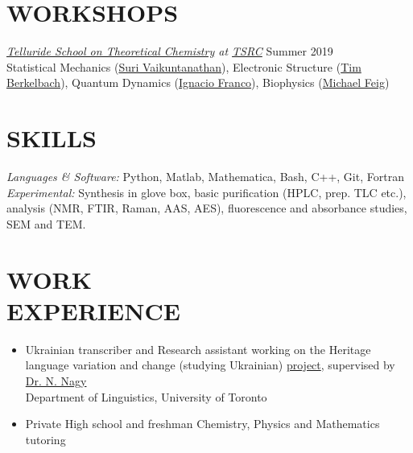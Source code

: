 \documentclass[9pt, margin]{res}
\begin{document}
\begin{resume}
\section{WORKSHOPS}
{\sl \href{http://vaikuntanathan-group.uchicago.edu/TSRC/telluride2019.html}{Telluride School on Theoretical Chemistry} at \href{https://www.telluridescience.org/schools/tellurideschoolontheoreticalchemistry}{TSRC}} \hfill Summer 2019 \\
Statistical Mechanics (\href{https://chemistry.uchicago.edu/faculty/suri-vaikuntanathan}{Suri Vaikuntanathan}), Electronic Structure (\href{https://chem.columbia.edu/people/faculty/timothy-berkelbach/}{Tim Berkelbach}), Quantum Dynamics (\href{http://www.sas.rochester.edu/chm/people/faculty/franco-ignacio/index.html}{Ignacio Franco}), Biophysics (\href{https://bmb.natsci.msu.edu/faculty/michael-feig/}{Michael Feig})


\section{SKILLS} 

{\sl Languages \& Software:} Python, Matlab, Mathematica, Bash, C++, Git, Fortran\\
{\sl Experimental:} Synthesis in glove box, basic purification (HPLC, prep. TLC etc.), analysis (NMR, FTIR, Raman, AAS, AES), fluorescence and absorbance studies, SEM and TEM.


\section{WORK \\ EXPERIENCE} 

\begin{itemize}
\item Ukrainian transcriber and Research assistant working on the Heritage language variation and change (studying Ukrainian) \href{http://projects.chass.utoronto.ca/ngn/HLVC/0_0_home.php}{project}, supervised by \href{http://individual.utoronto.ca/ngn/}{Dr. N. Nagy}\\ Department of Linguistics, University of Toronto 
\item Private High school and freshman Chemistry, Physics and Mathematics tutoring
\end{itemize}


\end{resume}
\end{document}
